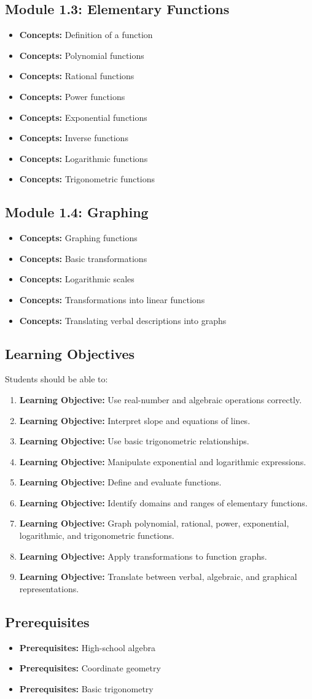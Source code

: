 \documentclass[11pt]{article}
\newcommand{\objective}[1]{\item \textbf{Learning Objective:} #1}
\newcommand{\concept}[1]{\item \textbf{Concepts:} #1}
\newcommand{\prereq}[1]{\item \textbf{Prerequisites:} #1}
\begin{document}
\subsection{Module 1.3: Elementary Functions}

\begin{itemize}
    \concept{Definition of a function}
    \concept{Polynomial functions}
    \concept{Rational functions}
    \concept{Power functions}
    \concept{Exponential functions}
    \concept{Inverse functions}
    \concept{Logarithmic functions}
    \concept{Trigonometric functions}
\end{itemize}

\subsection{Module 1.4: Graphing}

\begin{itemize}
    \concept{Graphing functions}
    \concept{Basic transformations}
    \concept{Logarithmic scales}
    \concept{Transformations into linear functions}
    \concept{Translating verbal descriptions into graphs}
\end{itemize}

\subsection{Learning Objectives}

Students should be able to:

\begin{enumerate}
    \objective{Use real-number and algebraic operations correctly.}
    \objective{Interpret slope and equations of lines.}
    \objective{Use basic trigonometric relationships.}
    \objective{Manipulate exponential and logarithmic expressions.}
    \objective{Define and evaluate functions.}
    \objective{Identify domains and ranges of elementary functions.}
    \objective{Graph polynomial, rational, power, exponential,
    logarithmic, and trigonometric functions.}
    \objective{Apply transformations to function graphs.}
    \objective{Translate between verbal, algebraic, and graphical
    representations.}
\end{enumerate}

\subsection{Prerequisites}

\begin{itemize}
    \prereq{High-school algebra}
    \prereq{Coordinate geometry}
    \prereq{Basic trigonometry}
\end{itemize}
\end{document}
